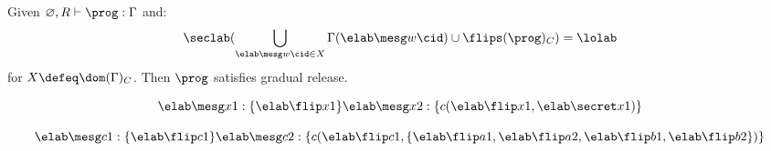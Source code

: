 \begin{theorem}
  Given $\varnothing,R \vdash \prog : \Gamma$ and:
  $$\seclab(\bigcup_{\mx{w}{\cid} \in X} \Gamma(\mx{w}{\cid}) \cup \flips(\prog)_C) = \lolab$$
  for $X \defeq \dom(\Gamma)_C$.
  Then $\prog$ satisfies gradual release.
\end{theorem}


$$
\mx{x}{1} : \setit{\rx{x}{1}}

\mx{x}{2} : \setit{\cty{\rx{x}{1}}{\sx{x}{1}}}
$$

$$
\mx{c}{1} : \setit{\rx{c}{1}}

\mx{c}{2} : \setit{ \cty{\rx{c}{1}}{\setit{\rx{a}{1},\rx{a}{2},\rx{b}{1},\rx{b}{2}}} }
$$
